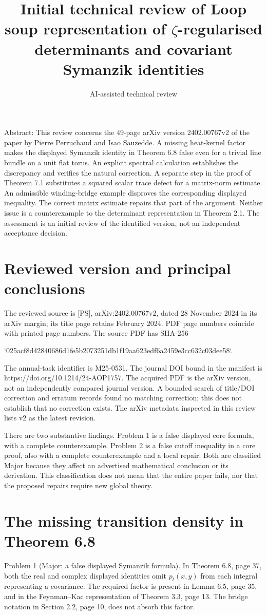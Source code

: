 \documentclass[10pt]{article}
\title{Initial technical review of
Loop soup representation of \(\zeta\)-regularised determinants
and covariant Symanzik identities}
\author{AI-assisted technical review}
\date{}
\begin{document}
\maketitle
Abstract: This review concerns the 49-page arXiv version 2402.00767v2 of the paper by Pierre Perruchaud and Isao Sauzedde. A missing heat-kernel factor makes the displayed Symanzik identity in Theorem 6.8 false even for a trivial line bundle on a unit flat torus. An explicit spectral calculation establishes the discrepancy and verifies the natural correction. A separate step in the proof of Theorem 7.1 substitutes a squared scalar trace defect for a matrix-norm estimate. An admissible winding-bridge example disproves the corresponding displayed inequality. The correct matrix estimate repairs that part of the argument. Neither issue is a counterexample to the determinant representation in Theorem 2.1. The assessment is an initial review of the identified version, not an independent acceptance decision.\par
\section*{Reviewed version and principal conclusions}
The reviewed source is [PS], arXiv:2402.00767v2, dated 28 November 2024 in its arXiv margin; its title page retains February 2024. PDF page numbers coincide with printed page numbers. The source PDF has SHA-256\par
`025acf8d42840686d1fe5b2073251db1f19aa623edf6a2459e3cc632c03dee58`.\par
The annual-task identifier is M25-0531. The journal DOI bound in the manifest is https://doi.org/10.1214/24-AOP1757. The acquired PDF is the arXiv version, not an independently compared journal version. A bounded search of title/DOI correction and erratum records found no matching correction; this does not establish that no correction exists. The arXiv metadata inspected in this review lists v2 as the latest revision.\par
There are two substantive findings. Problem 1 is a false displayed core formula, with a complete counterexample. Problem 2 is a false cutoff inequality in a core proof, also with a complete counterexample and a local repair. Both are classified Major because they affect an advertised mathematical conclusion or its derivation. This classification does not mean that the entire paper fails, nor that the proposed repairs require new global theory.\par
\section*{The missing transition density in Theorem 6.8}
Problem 1 (Major: a false displayed Symanzik formula).  In Theorem 6.8, page 37, both the real and complex displayed identities omit \(p_t(x,y)\) from each integral representing a covariance. The required factor is present in Lemma 6.5, page 35, and in the Feynman–Kac representation of Theorem 3.3, page 13. The bridge notation in Section 2.2, page 10, does not absorb this factor.\par
\end{document}
